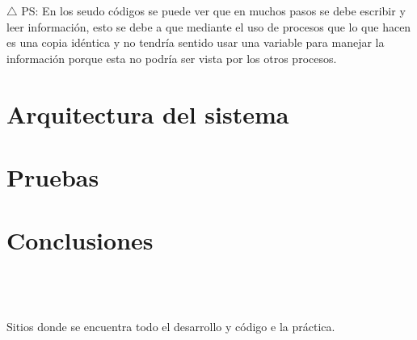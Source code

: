 \documentclass[
	final,
	notitlepage,
	narroweqnarray,
	inline,
	twoside,
	]{ieee}
\begin{document}
	$\triangle$ PS: En los seudo códigos se puede ver que en muchos pasos se debe escribir y leer información, esto se debe a que mediante el uso
	de procesos que lo que hacen es una copia idéntica y no tendría sentido usar una variable para manejar la información porque esta no podría ser
	vista por los otros procesos.

\section{Arquitectura del sistema}
	

\section{Pruebas}
	
	
\section{Conclusiones}
	
	
\begin{thebibliography}{1}

\\
 \\
 \\
\newblock Sitios donde se encuentra todo el desarrollo y código e la práctica.

\end{thebibliography}
\end{document}
